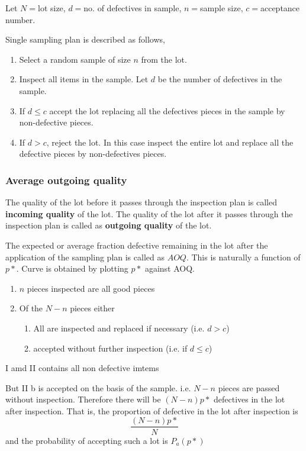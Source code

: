 \documentclass[oneside,11pt,pdftex]{book}%
\numberwithin{equation}{section}
\numberwithin{section}{chapter}
\numberwithin{equation}{chapter}
\begin{document}
Let $ N= $lot size, $ d= $no. of defectives in sample, $ n= $sample size, $ c=$acceptance number.

Single sampling plan is described as follows,
\begin{enumerate}
	\item Select a random sample of size $ n $ from the lot.
	\item Inspect all items in the sample. Let $ d $ be the number of defectives in the sample.
	\item If $ d \leq c  $ accept the lot replacing all the defectives pieces in the sample by non-defective pieces.
	\item If $ d >c $, reject the lot. In this case inspect the entire lot and replace all the defective pieces by non-defectives pieces.
\end{enumerate}

\subsubsection{Average outgoing quality}
The quality of the lot before it passes through the inspection plan is called \textbf{incoming quality} of the lot. The quality of the lot after it passes through the inspection plan is called as \textbf{outgoing quality} of the lot.

The expected or average fraction defective remaining in the lot after the application of the sampling plan is called as $ AOQ $. This is naturally a function of $ p* $. Curve is obtained by plotting $ p* $ against AOQ.

\begin{enumerate}
	\item $ n $ pieces inspected are all good pieces
	\item Of the $ N-n $ pieces either
	\begin{enumerate}
		\item All are inspected and replaced if necessary (i.e. $ d > c $)
		\item accepted without further inspection (i.e. if $ d \leq c $)
	\end{enumerate}
\end{enumerate}


I amd II contains all non defective imtems

But II b is accepted on the basis of the sample. i.e. $ N-n $ pieces are passed without inspection. Therefore there will be $ (N-n)p*$ defectives in the lot after inspection. That is, the proportion of defective in the lot after inspection is \[ \frac{(N-n)p*}{N} \] and the probability of accepting such a lot is $ P_a(p*) $
\end{document}
